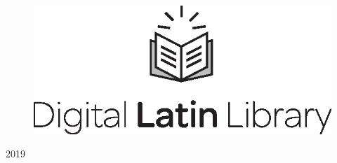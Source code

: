 \documentclass[a4paper, 11pt, oneside]{book} %
\begin{document}
\begin{titlepage}

\begin{figure}[h] %
\includegraphics[scale=0.60]{DLL} %
\centering %
\end{figure}

{\normalsize 2019}
\end{titlepage}
\end{document}
